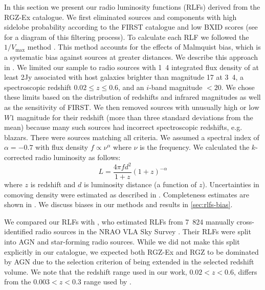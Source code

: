   In this section we present our radio luminosity functions (RLFs) derived
  from the RGZ-Ex catalogue. We first eliminated sources and components with high sidelobe probability according to the FIRST catalogue and low BXID scores (see  for a diagram of this filtering process). To calculate each RLF we 
  followed the $1/V_{\max}$ method \citep{schmidt1968vmax}. This method accounts for the effects of Malmquist bias, which is a systematic bias against sources at greater distances. We
  describe this approach in . We limited our sample to radio sources with
  \unit{1.4}{\giga\hertz} integrated flux density of at least \unit{2}{\milli Jy}
  associated with host galaxies brighter than magnitude 17 at
  \unit{3.4}{\micro\meter}, a spectroscopic redshift $0.02 \leq z \leq 0.6$,
  and an $i$-band magnitude $<20$. We chose these
  limits based on the distribution of redshifts and infrared magnitudes as well as the sensitivity of FIRST. We then removed sources with unusually high or low $W1$ magnitude for their redshift (more than three standard deviations from the mean) because many such sources had incorrect spectroscopic redshifts, e.g. blazars. There were \nsourcesrlf{} sources matching all criteria. We assumed a spectral index of $\alpha = -0.7$ \citep[as is common in literature, e.g.][]{condon02radio} with flux density $f \propto \nu^{\alpha}$ where $\nu$ is the frequency. We calculated the $k$-corrected radio luminosity \citep{kochanek01kband} as follows:
  \begin{equation}
      \label{eq:luminosity}
      L = \frac{4\pi f d^2}{1+z}{(1+z)^{-\alpha}}
  \end{equation}
  where $z$ is redshift and $d$ is luminosity distance (a function of $z$).
  Uncertainties in comoving density were estimated as described in . Completeness estimates are shown in . We discuss biases in our methods and results in \autoref{sec:rlfs-bias}.

  We compared our RLFs with \citet{mauch07rlf}, who estimated RLFs from 7~824
  manually cross-identified radio sources in the NRAO VLA Sky Survey \citep[NVSS;][]{condon98nvss}.
  Their RLFs were split into AGN and star-forming radio sources. While we
  did not make this split explicitly in our catalogue, we expected both RGZ-Ex
  and RGZ to be dominated by AGN due to the selection criterion of being extended in the selected redshift volume. We note that the redshift range used in our work, $0.02 < z < 0.6$, differs from the $0.003 < z < 0.3$ range used by \citet{mauch07rlf}.

